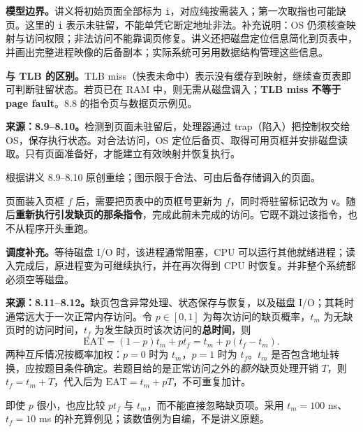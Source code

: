 \textbf{模型边界。}讲义将初始页面全部标为 \texttt{i}，对应纯按需装入；第一次取指也可能缺页。这里的 \texttt{i} 表示未驻留，不能单凭它断定地址非法。补充说明：OS 仍须核查映射与访问权限；非法访问不能靠调页修复。讲义还把磁盘定位信息简化到页表中，并画出完整进程映像的后备副本；实际系统可另用数据结构管理这些信息。

\textbf{与 TLB 的区别。}TLB miss（快表未命中）表示没有缓存到映射，继续查页表即可判断驻留状态。若页已在 RAM 中，则无需从磁盘调入；\textbf{TLB miss 不等于 page fault}。8.8 的指令页与数据页示例见。


\textbf{来源：8.9--8.10。}检测到页面未驻留后，处理器通过 trap（陷入）把控制权交给 OS，保存执行状态。对合法访问，OS 定位后备页、取得可用页框并安排磁盘读取。只有页面准备好，才能建立有效映射并恢复执行。

\begin{center}


{\small 根据讲义 8.9--8.10 原创重绘；图示限于合法、可由后备存储调入的页面。}
\end{center}

页面装入页框 $f$ 后，需要把页表中的页框号更新为 $f$，同时将驻留标记改为 \texttt{v}。随后\textbf{重新执行引发缺页的那条指令}，完成此前未完成的访问。它既不跳过该指令，也不从程序开头重跑。

\textbf{调度补充。}等待磁盘 I/O 时，该进程通常阻塞，CPU 可以运行其他就绪进程；读入完成后，原进程变为可继续执行，并在再次得到 CPU 时恢复。并非整个系统都必须空等磁盘。


\textbf{来源：8.11--8.12。}缺页包含异常处理、状态保存与恢复，以及磁盘 I/O；其耗时通常远大于一次正常内存访问。令 $p\in[0,1]$ 为每次访问的缺页概率，$t_m$ 为无缺页时的访问时间，$t_f$ 为发生缺页时该次访问的\textbf{总时间}，则
\[
 \boxed{\mathrm{EAT}=(1-p)t_m+pt_f
                    =t_m+p(t_f-t_m)}.
\]
两种互斥情况按概率加权：$p=0$ 时为 $t_m$，$p=1$ 时为 $t_f$。$t_m$ 是否包含地址转换，应按题目条件确定。若题目给的是正常访问之外的\emph{额外}缺页处理开销 $T$，则 $t_f=t_m+T$，代入后为 $\mathrm{EAT}=t_m+pT$，不可重复加计。

即使 $p$ 很小，也应比较 $pt_f$ 与 $t_m$，而不能直接忽略缺页项。采用 $t_m=100$ ns、$t_f=10$ ms 的补充算例见；该数值例为自编，不是讲义原题。

